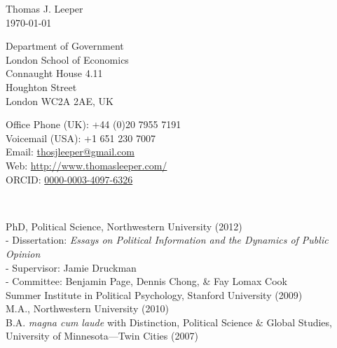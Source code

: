 \documentclass[12pt]{article}
\renewcommand{\section}[1]{\pagebreak[3]%
    \llap{\scshape\smash{\parbox[t]{\marginparwidth}{\raggedright {\color{lg}#1}}}}%
    \vspace{-\baselineskip}\par}
\newcommand{\entry}[1]{\indent {\color{lg}\guillemotright}\hspace{2pt}#1\vspace{.25em}\\}
\newcommand{\subentry}[1]{{\color{lg}-} #1\vspace{.25em}\\}
\begin{document}
{\LARGE Thomas J. Leeper}\\

\today\\

\begin{minipage}[b]{0.5\linewidth}
Department of Government\\
London School of Economics\\
Connaught House 4.11\\
Houghton Street\\
London WC2A 2AE, UK
\end{minipage}
\begin{minipage}[b]{0.5\linewidth}
Office Phone (UK): +44 (0)20 7955 7191\\
Voicemail (USA): +1 651 230 7007\\
Email: \href{mailto:thosjleeper@gmail.com}{thosjleeper@gmail.com}\\
Web: \href{http://www.thomasleeper.com/}{http://www.thomasleeper.com/}\\
ORCID: \href{http://orcid.org/0000-0003-4097-6326}{0000-0003-4097-6326}
\end{minipage}\\

\section{Education}
\entry{PhD, Political Science, Northwestern University (2012)}
	\subentry{Dissertation: \textit{Essays on Political Information and the Dynamics of Public Opinion}}
	\subentry{Supervisor: Jamie Druckman}
	\subentry{Committee: Benjamin Page, Dennis Chong, \& Fay Lomax Cook}
\entry{Summer Institute in Political Psychology, Stanford University (2009)}
\entry{M.A., Northwestern University (2010)}
\entry{B.A. \textit{magna cum laude} with Distinction, Political Science \& Global Studies, University of Minnesota---Twin Cities (2007)}
\end{document}
